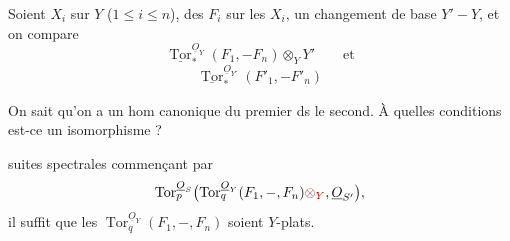 Soient $X_i$ sur $Y$ ($1\leq i\leq n$), des $F_i$ sur les $X_i$,  un changement de base $Y'-Y$, et on compare
\[
\underline{\operatorname{Tor}}_*^{\underline O_Y}(F_1,-F_n)\otimes_Y Y'\qquad\text{et}
\]
\[
\underline{\operatorname{Tor}}_*^{\underline O_{Y'}}(F'_1,-F'_n)
\]

On sait qu'on a un hom canonique du premier ds le second. À quelles conditions est-ce un isomorphisme ?

  suites spectrales  commençant par
\[
\operatorname{Tor}_p^{\underline O_S}\bigl(\operatorname{Tor}_q^{\underline O_Y}(F_1,-,F_n)\deleted{\otimes_Y},\underline O_{S'}\bigr),
\]
il suffit que les $\operatorname{Tor}_q^{\underline O_Y}(F_1,-,F_n)$ soient $Y$-plats.

